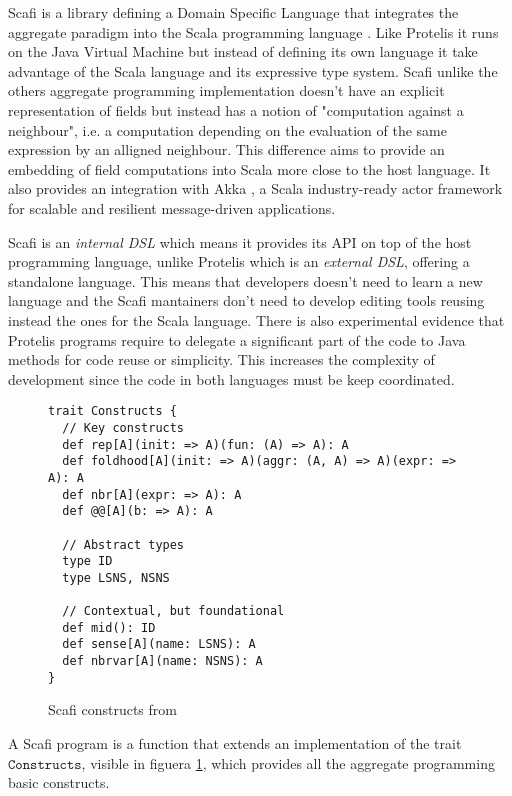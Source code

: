 Scafi \cite{Scafi, scafiphd} is a library defining a Domain Specific Language that integrates the aggregate paradigm into the Scala programming language \cite{Scala}. Like Protelis it runs on the Java Virtual Machine but instead of defining its own language it take advantage of the Scala language and its expressive type system. Scafi unlike the others aggregate programming implementation doesn't have an explicit representation of fields but instead has a notion of "computation against a neighbour", i.e. a computation depending on the evaluation of the same expression by an alligned neighbour. This difference aims to provide an embedding of field computations into Scala more close to the host language. It also provides an integration with Akka \cite{Akka}, a Scala industry-ready actor framework for scalable and resilient message-driven applications.

Scafi is an \textit{internal DSL} which means it provides its API on top of the host programming language, unlike Protelis which is an \textit{external DSL}, offering a standalone language. This means that developers doesn't need to learn a new language and the Scafi mantainers don't need to develop editing tools reusing instead the ones for the Scala language. There is also experimental evidence that Protelis programs require to delegate a significant part of the code to Java methods for code reuse or simplicity. This increases the complexity of development since the code in both languages must be keep coordinated.

\begin{figure}[t]
\begin{lstlisting}[language={scafi},frame=single]
trait Constructs {
  // Key constructs
  def rep[A](init: => A)(fun: (A) => A): A
  def foldhood[A](init: => A)(aggr: (A, A) => A)(expr: => A): A
  def nbr[A](expr: => A): A
  def @@[A](b: => A): A

  // Abstract types
  type ID
  type LSNS, NSNS

  // Contextual, but foundational
  def mid(): ID
  def sense[A](name: LSNS): A
  def nbrvar[A](name: NSNS): A
}
\end{lstlisting}
\caption{Scafi constructs from \cite{Scafi}}\label{fig:scaficonstructs}
\end{figure}

A Scafi program is a function that extends an implementation of the trait $\mathtt{Constructs}$, visible in figuera \ref{fig:scaficonstructs}, which provides all the aggregate programming basic constructs. 

